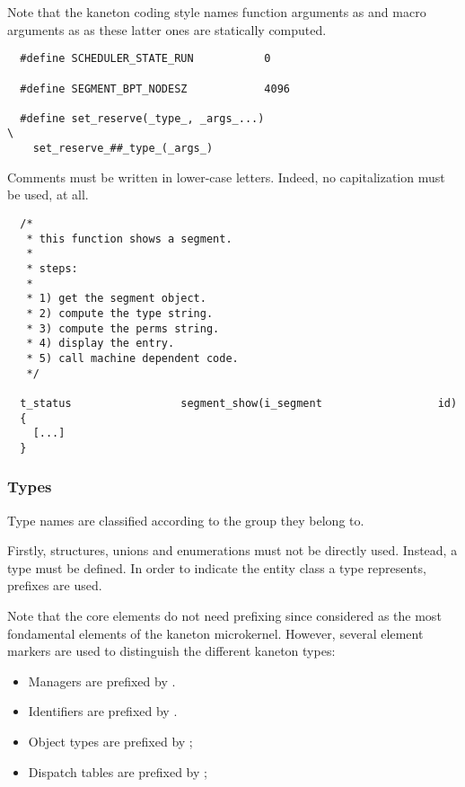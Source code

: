 Note that the kaneton coding style names function arguments as
 and macro arguments as  as these
latter ones are statically computed.

\begin{verbatim}
  #define SCHEDULER_STATE_RUN           0

  #define SEGMENT_BPT_NODESZ            4096

  #define set_reserve(_type_, _args_...)                                \
    set_reserve_##_type_(_args_)
\end{verbatim}

Comments must be written in lower-case letters. Indeed, no capitalization
must be used, at all.

\begin{verbatim}
  /*
   * this function shows a segment.
   *
   * steps:
   *
   * 1) get the segment object.
   * 2) compute the type string.
   * 3) compute the perms string.
   * 4) display the entry.
   * 5) call machine dependent code.
   */

  t_status                 segment_show(i_segment                  id)
  {
    [...]
  }
\end{verbatim}


\subsubsection{Types}

Type names are classified according to the group they belong to.

Firstly, structures, unions and enumerations must not be directly used.
Instead, a type must be defined. In order to indicate the entity class a type
represents, prefixes are used.

Note that the core elements do not need prefixing since considered as the
most fondamental elements of the kaneton microkernel. However, several
element markers are used to distinguish the different kaneton types:

\begin{itemize}
  \item
    Managers are prefixed by .
  \item
    Identifiers are prefixed by .
  \item
    Object types are prefixed by ;
  \item
    Dispatch tables are prefixed by ;
\end{itemize}

